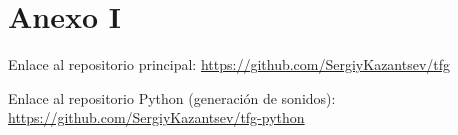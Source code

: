 
\chapter{Anexo I}
\par Enlace al repositorio principal: \url{https://github.com/SergiyKazantsev/tfg}
\par Enlace al repositorio Python (generación de sonidos): \url{https://github.com/SergiyKazantsev/tfg-python}